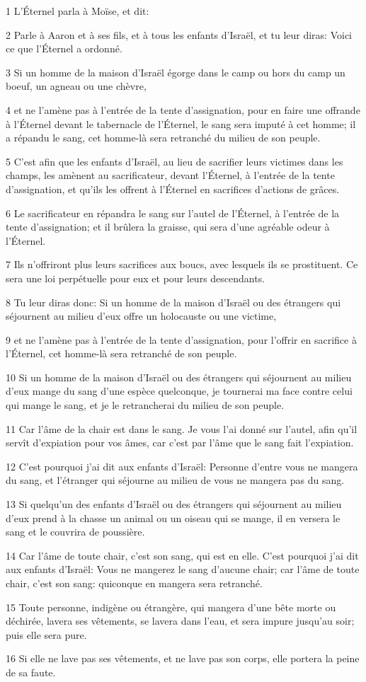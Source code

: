 \par 1 L'Éternel parla à Moïse, et dit:
\par 2 Parle à Aaron et à ses fils, et à tous les enfants d'Israël, et tu leur diras: Voici ce que l'Éternel a ordonné.
\par 3 Si un homme de la maison d'Israël égorge dans le camp ou hors du camp un boeuf, un agneau ou une chèvre,
\par 4 et ne l'amène pas à l'entrée de la tente d'assignation, pour en faire une offrande à l'Éternel devant le tabernacle de l'Éternel, le sang sera imputé à cet homme; il a répandu le sang, cet homme-là sera retranché du milieu de son peuple.
\par 5 C'est afin que les enfants d'Israël, au lieu de sacrifier leurs victimes dans les champs, les amènent au sacrificateur, devant l'Éternel, à l'entrée de la tente d'assignation, et qu'ils les offrent à l'Éternel en sacrifices d'actions de grâces.
\par 6 Le sacrificateur en répandra le sang sur l'autel de l'Éternel, à l'entrée de la tente d'assignation; et il brûlera la graisse, qui sera d'une agréable odeur à l'Éternel.
\par 7 Ils n'offriront plus leurs sacrifices aux boucs, avec lesquels ils se prostituent. Ce sera une loi perpétuelle pour eux et pour leurs descendants.
\par 8 Tu leur diras donc: Si un homme de la maison d'Israël ou des étrangers qui séjournent au milieu d'eux offre un holocauste ou une victime,
\par 9 et ne l'amène pas à l'entrée de la tente d'assignation, pour l'offrir en sacrifice à l'Éternel, cet homme-là sera retranché de son peuple.
\par 10 Si un homme de la maison d'Israël ou des étrangers qui séjournent au milieu d'eux mange du sang d'une espèce quelconque, je tournerai ma face contre celui qui mange le sang, et je le retrancherai du milieu de son peuple.
\par 11 Car l'âme de la chair est dans le sang. Je vous l'ai donné sur l'autel, afin qu'il servît d'expiation pour vos âmes, car c'est par l'âme que le sang fait l'expiation.
\par 12 C'est pourquoi j'ai dit aux enfants d'Israël: Personne d'entre vous ne mangera du sang, et l'étranger qui séjourne au milieu de vous ne mangera pas du sang.
\par 13 Si quelqu'un des enfants d'Israël ou des étrangers qui séjournent au milieu d'eux prend à la chasse un animal ou un oiseau qui se mange, il en versera le sang et le couvrira de poussière.
\par 14 Car l'âme de toute chair, c'est son sang, qui est en elle. C'est pourquoi j'ai dit aux enfants d'Israël: Vous ne mangerez le sang d'aucune chair; car l'âme de toute chair, c'est son sang: quiconque en mangera sera retranché.
\par 15 Toute personne, indigène ou étrangère, qui mangera d'une bête morte ou déchirée, lavera ses vêtements, se lavera dans l'eau, et sera impure jusqu'au soir; puis elle sera pure.
\par 16 Si elle ne lave pas ses vêtements, et ne lave pas son corps, elle portera la peine de sa faute.

